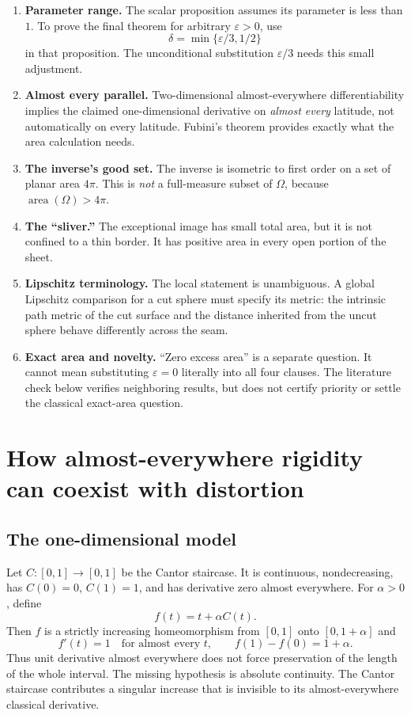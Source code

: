 \documentclass[11pt,letterpaper]{article}
\numberwithin{equation}{section}
\theoremstyle{remark}
\newcommand{\area}{\operatorname{area}}
\newcommand{\eps}{\varepsilon}
\begin{document}
\begin{enumerate}
\item \textbf{Parameter range.} The scalar proposition assumes its parameter is less than $1$. To prove the final theorem for arbitrary $\eps>0$, use
\begin{equation}\label{eq:delta}
 \delta=\min\{\eps/3,1/2\}
\end{equation}
in that proposition. The unconditional substitution $\eps/3$ needs this small adjustment.
\item \textbf{Almost every parallel.} Two-dimensional almost-everywhere differentiability implies the claimed one-dimensional derivative on \emph{almost every} latitude, not automatically on every latitude. Fubini's theorem provides exactly what the area calculation needs.
\item \textbf{The inverse's good set.} The inverse is isometric to first order on a set of planar area $4\pi$. This is \emph{not} a full-measure subset of $\Omega$, because $\area(\Omega)>4\pi$.
\item \textbf{The ``sliver.''} The exceptional image has small total area, but it is not confined to a thin border. It has positive area in every open portion of the sheet.
\item \textbf{Lipschitz terminology.} The local statement is unambiguous. A global Lipschitz comparison for a cut sphere must specify its metric: the intrinsic path metric of the cut surface and the distance inherited from the uncut sphere behave differently across the seam.
\item \textbf{Exact area and novelty.} ``Zero excess area'' is a separate question. It cannot mean substituting $\eps=0$ literally into all four clauses. The literature check below verifies neighboring results, but does not certify priority or settle the classical exact-area question.
\end{enumerate}

\section{How almost-everywhere rigidity can coexist with distortion}
\label{sec:meaning}

\subsection{The one-dimensional model}

Let $C:[0,1]\to[0,1]$ be the Cantor staircase. It is continuous, nondecreasing, has $C(0)=0$, $C(1)=1$, and has derivative zero almost everywhere. For $\alpha>0$, define
\[
 f(t)=t+\alpha C(t).
\]
Then $f$ is a strictly increasing homeomorphism from $[0,1]$ onto $[0,1+\alpha]$ and
\[
 f'(t)=1\quad\text{for almost every }t,
 \qquad f(1)-f(0)=1+\alpha.
\]
Thus unit derivative almost everywhere does not force preservation of the length of the whole interval. The missing hypothesis is absolute continuity. The Cantor staircase contributes a singular increase that is invisible to its almost-everywhere classical derivative.
\end{document}
